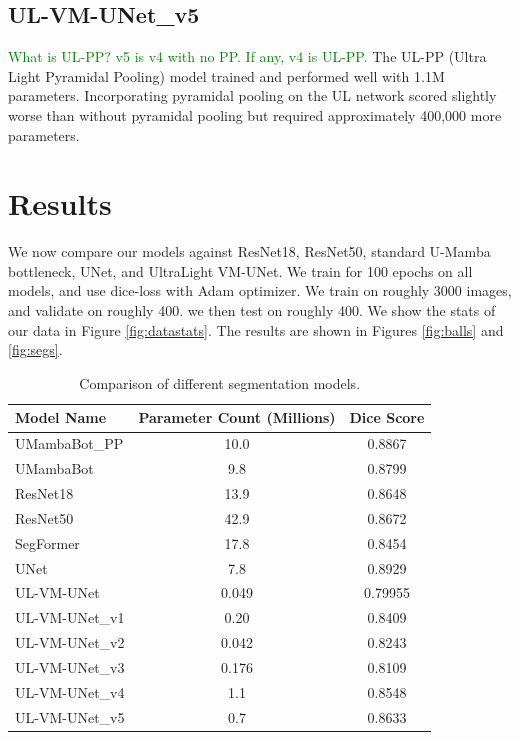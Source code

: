 \documentclass[conference]{IEEEtran}
\newcommand{\gr}[1]{\textcolor{green}{#1}}
\begin{document}
\subsection{UL-VM-UNet\_v5}
\gr{What is UL-PP? v5 is v4 with no PP. If any, v4 is UL-PP.}
The UL-PP (Ultra Light Pyramidal Pooling) model trained and performed well with 1.1M parameters. Incorporating pyramidal pooling on the UL network scored slightly worse than without pyramidal pooling but required approximately 400,000 more parameters.


\section{Results}
We now compare our models against ResNet18, ResNet50, standard U-Mamba bottleneck, UNet, and UltraLight VM-UNet. We train for 100 epochs on all models, and use dice-loss with Adam optimizer. We train on roughly 3000 images, and validate on roughly 400. we then test on roughly 400. We show the stats of our data in Figure \ref{fig:datastats}.
The results are shown in Figures \ref{fig:balls} and \ref{fig:segs}.

\begin{table}[ht]
    \centering
    \begin{tabular}{|l|c|c|}
        \hline
        \textbf{Model Name} & \textbf{Parameter Count (Millions)} & \textbf{Dice Score} \\
        \hline
        UMambaBot\_PP & 10.0 & 0.8867 \\
        UMambaBot & 9.8 & 0.8799 \\
        ResNet18 & 13.9 & 0.8648 \\
        ResNet50 & 42.9 & 0.8672 \\
        SegFormer & 17.8 & 0.8454 \\
        UNet & 7.8 & 0.8929 \\
        UL-VM-UNet & 0.049 & 0.79955 \\
        UL-VM-UNet\_v1 & 0.20 & 0.8409 \\
        UL-VM-UNet\_v2 & 0.042 & 0.8243 \\
        UL-VM-UNet\_v3 & 0.176 & 0.8109 \\
        UL-VM-UNet\_v4 & 1.1 & 0.8548 \\
        UL-VM-UNet\_v5 & 0.7 & 0.8633 \\
        \hline
    \end{tabular}
    \caption{Comparison of different segmentation models.}
    \label{tab:model_comparison}
\end{table}
\end{document}
